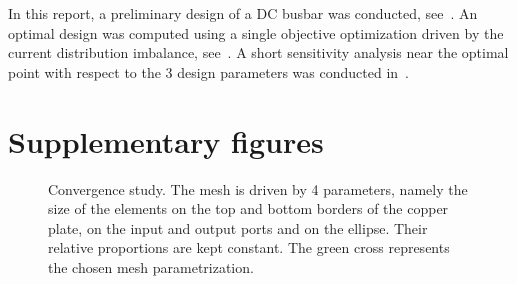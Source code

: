\documentclass[10pt,a4paper]{article}
\begin{document}
In this report, a preliminary design of a DC busbar was conducted, see~.
An optimal design was computed using a single objective optimization driven by the current distribution imbalance,
see~.
A short sensitivity analysis near the optimal point with respect to the 3 design parameters was conducted in~.

\pagebreak

\section{Supplementary figures}

\begin{figure}[h]
    \centering
    
    \caption{
        Convergence study.
        The mesh is driven by 4 parameters, namely the size of the elements on the top and bottom borders of the copper plate,
        on the input and output ports and on the ellipse.
        Their relative proportions are kept constant.
        The \textcolor{darkpastelgreen}{green cross} represents the chosen mesh parametrization.
    }
    \label{figure:mesh-convergence}
\end{figure}
\end{document}
